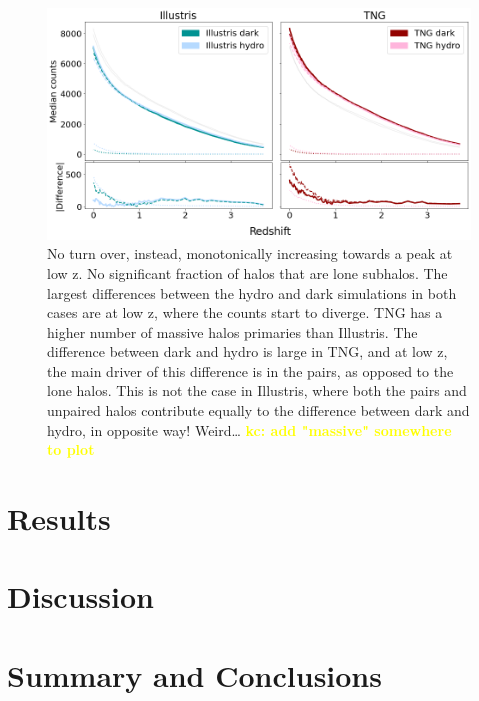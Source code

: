 \documentclass[twocolumn]{aastex631}
\newcommand{\kc}[1]{\textcolor{yellow}{\textbf{kc: #1}} }
\begin{document}
\begin{figure}[htb]
  \centering
  \includegraphics[width=\textwidth]{counts_massive.png}
  \caption{No turn over, instead, monotonically increasing towards a peak at low z. No significant fraction of halos that are lone subhalos. The largest differences between the hydro and dark simulations in both cases are at low z, where the counts start to diverge. TNG has a higher number of massive halos primaries than Illustris. The difference between dark and hydro is large in TNG, and at low z, the main driver of this difference is in the pairs, as opposed to the lone halos. This is not the case in Illustris, where both the pairs and unpaired halos contribute equally to the difference between dark and hydro, in opposite way! Weird… \kc{add "massive" somewhere to plot}
    }
  \label{fig:counts-massive}
\end{figure}


\section{Results}
\label{sec:results}


\section{Discussion}
\label{sec:discussion}


\section{Summary and Conclusions}
\label{sec:summary}


{}

\end{document}
